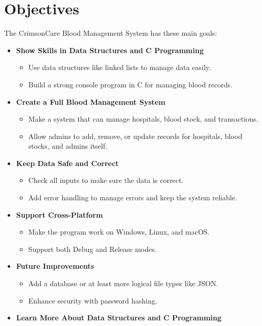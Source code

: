 \documentclass[12pt,a4paper]{report}
\begin{document}
\section{Objectives}
The CrimsonCare Blood Management System has these main goals:
\begin{itemize}
    \item \normalsize \textbf{Show Skills in Data Structures and C Programming}
    \begin{itemize}
        \item Use data structures like linked lists to manage data easily.
        \item Build a strong console program in C for managing blood records.
    \end{itemize}
    \item \normalsize \textbf{Create a Full Blood Management System}
    \begin{itemize}
        \item Make a system that can manage hospitals, blood stock, and transactions.
        \item Allow admins to add, remove, or update records for hospitals, blood stocks, and admins itself.
    \end{itemize}
    \item \normalsize \textbf{Keep Data Safe and Correct}
    \begin{itemize}
        \item Check all inputs to make sure the data is correct.
        \item Add error handling to manage errors and keep the system reliable.
    \end{itemize}
    \item \normalsize \textbf{Support Cross-Platform}
    \begin{itemize}
        \item Make the program work on Windows, Linux, and macOS.\
        \item Support both Debug and Release modes.
    \end{itemize}
    \item \normalsize \textbf{Future Improvements}
    \begin{itemize}
        \item Add a database or at least more logical file types like JSON.\
        \item Enhance security with password hashing.
    \end{itemize}
    \item \normalsize \textbf{Learn More About Data Structures and C Programming}

\end{itemize}
\end{document}
